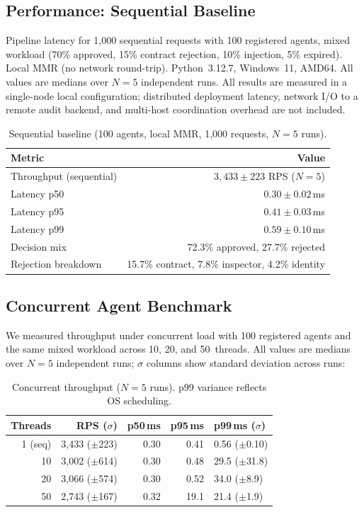 \documentclass[11pt,a4paper]{article}
\begin{document}
\subsection{Performance: Sequential Baseline}

Pipeline latency for 1,000 sequential requests with 100 registered agents, mixed workload (70\%
approved, 15\% contract rejection, 10\% injection, 5\% expired). Local MMR (no network
round-trip). Python~3.12.7, Windows~11, AMD64. All values are medians over $N=5$ independent
runs. All results are measured in a single-node local configuration; distributed deployment
latency, network I/O to a remote audit backend, and multi-host coordination overhead are not
included.

\begin{table}[ht]
\centering
\caption{Sequential baseline (100 agents, local MMR, 1,000 requests, $N=5$ runs).}
\label{tab:perf}
\begin{tabular}{@{}lr@{}}
\toprule
\textbf{Metric} & \textbf{Value} \\
\midrule
Throughput (sequential)  & $3{,}433 \pm 223$ RPS ($N=5$) \\
Latency p50              & $0.30 \pm 0.02$\,ms \\
Latency p95              & $0.41 \pm 0.03$\,ms \\
Latency p99              & $0.59 \pm 0.10$\,ms \\
Decision mix             & 72.3\% approved, 27.7\% rejected \\
Rejection breakdown      & 15.7\% contract, 7.8\% inspector, 4.2\% identity \\
\bottomrule
\end{tabular}
\end{table}

\subsection{Concurrent Agent Benchmark}

We measured throughput under concurrent load with 100 registered agents and the same mixed
workload across 10, 20, and 50~threads. All values are medians over $N=5$ independent runs;
$\sigma$ columns show standard deviation across runs:

\begin{table}[ht]
\centering
\caption{Concurrent throughput ($N=5$ runs). p99 variance reflects OS scheduling.}
\label{tab:concurrent}
\begin{tabular}{@{}rrrrl@{}}
\toprule
\textbf{Threads} & \textbf{RPS ($\sigma$)} & \textbf{p50\,ms} & \textbf{p95\,ms} & \textbf{p99\,ms ($\sigma$)} \\
\midrule
1 (seq) & 3,433 ($\pm$223) & 0.30 & 0.41 & 0.56 ($\pm$0.10) \\
10      & 3,002 ($\pm$614) & 0.30 & 0.48 & 29.5 ($\pm$31.8) \\
20      & 3,066 ($\pm$574) & 0.30 & 0.52 & 34.0 ($\pm$8.9) \\
50      & 2,743 ($\pm$167) & 0.32 & 19.1 & 21.4 ($\pm$1.9) \\
\bottomrule
\end{tabular}
\end{table}
\end{document}

